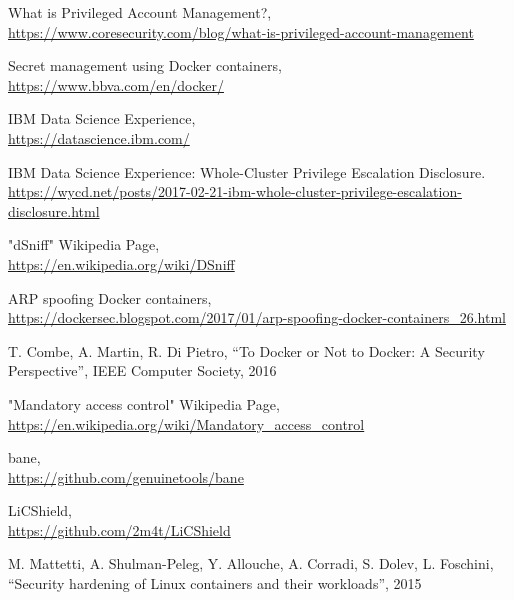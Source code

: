 \documentclass[a4paper,12pt]{article}
\begin{document}
\begin{thebibliography}{99}
What is Privileged Account Management?, \\ \url{https://www.coresecurity.com/blog/what-is-privileged-account-management}

Secret management using Docker containers, \\ \url{https://www.bbva.com/en/docker/}

IBM Data Science Experience, \\ \url{https://datascience.ibm.com/}

IBM Data Science Experience: Whole-Cluster Privilege Escalation Disclosure. \\ \url{https://wycd.net/posts/2017-02-21-ibm-whole-cluster-privilege-escalation-disclosure.html}

"dSniff" Wikipedia Page, \\ \url{https://en.wikipedia.org/wiki/DSniff}

ARP spoofing Docker containers, \\ \url{https://dockersec.blogspot.com/2017/01/arp-spoofing-docker-containers_26.html}

T. Combe, A. Martin, R. Di Pietro, ``To Docker or Not to Docker: A Security
Perspective'', IEEE Computer Society, 2016

"Mandatory access control" Wikipedia Page, \\ \url{https://en.wikipedia.org/wiki/Mandatory_access_control}

bane, \\ \url{https://github.com/genuinetools/bane}

LiCShield, \\ \url{https://github.com/2m4t/LiCShield}

M. Mattetti, A. Shulman-Peleg, Y. Allouche, A. Corradi, S. Dolev, L. Foschini,
``Security hardening of Linux containers and their workloads'', 2015

\end{thebibliography}
\end{document}
